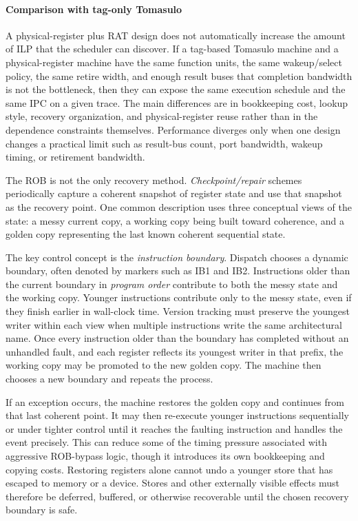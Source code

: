 \paragraph{Comparison with tag-only Tomasulo}\label{par:ilp-tag-vs-preg}
A physical-register plus RAT design does not automatically increase the amount of ILP that the scheduler can discover.
If a tag-based Tomasulo machine and a physical-register machine have the same function units, the same wakeup/select policy, the same retire width, and enough result buses that completion bandwidth is not the bottleneck, then they can expose the same execution schedule and the same IPC on a given trace.
The main differences are in bookkeeping cost, lookup style, recovery organization, and physical-register reuse rather than in the dependence constraints themselves.
Performance diverges only when one design changes a practical limit such as result-bus count, port bandwidth, wakeup timing, or retirement bandwidth.

The ROB is not the only recovery method.
\textit{Checkpoint/repair} schemes periodically capture a coherent snapshot of register state and use that snapshot as the recovery point.
One common description uses three conceptual views of the state: a messy current copy, a working copy being built toward coherence, and a golden copy representing the last known coherent sequential state.

The key control concept is the \textit{instruction boundary}.
Dispatch chooses a dynamic boundary, often denoted by markers such as IB1 and IB2.
Instructions older than the current boundary in \emph{program order} contribute to both the messy state and the working copy.
Younger instructions contribute only to the messy state, even if they finish earlier in wall-clock time.
Version tracking must preserve the youngest writer within each view when multiple instructions write the same architectural name.
Once every instruction older than the boundary has completed without an unhandled fault, and each register reflects its youngest writer in that prefix, the working copy may be promoted to the new golden copy.
The machine then chooses a new boundary and repeats the process.

If an exception occurs, the machine restores the golden copy and continues from that last coherent point.
It may then re-execute younger instructions sequentially or under tighter control until it reaches the faulting instruction and handles the event precisely.
This can reduce some of the timing pressure associated with aggressive ROB-bypass logic, though it introduces its own bookkeeping and copying costs.
Restoring registers alone cannot undo a younger store that has escaped to memory or a device.
Stores and other externally visible effects must therefore be deferred, buffered, or otherwise recoverable until the chosen recovery boundary is safe.


